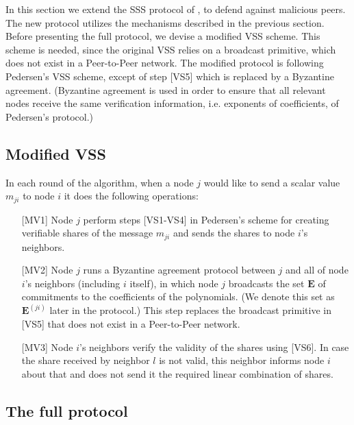 \documentclass[10pt]{svjour3}
\begin{document}
In this section we extend the SSS protocol of , to
defend against malicious peers.  The new protocol utilizes the
mechanisms described in the previous section.  Before presenting the
full protocol, we devise a modified VSS scheme.  This scheme is
needed, since the original VSS relies on a broadcast primitive, which
does not exist in a Peer-to-Peer network. The modified protocol is
following Pedersen's VSS scheme, except of step [VS5] which is
replaced by a Byzantine agreement. (Byzantine agreement is used in
order to ensure that all relevant nodes receive the same verification
information, i.e. exponents of coefficients, of Pedersen's protocol.)


\subsection{Modified VSS}
In each round of the algorithm, when a node $j$ would like to send
a scalar value $m_{ji}$ to node $i$ it does the following operations:
\begin{itemize}
\item [{[MV1]}] Node $j$ perform steps [VS1-VS4] in Pedersen's
scheme for creating verifiable shares of the message $m_{ji}$ and
sends the shares to node $i$'s neighbors.

\item [{[MV2]}] Node $j$ runs a Byzantine agreement protocol
  between $j$ and all of node $i$'s neighbors (including $i$ itself), in which node $j$
  broadcasts the set $\mathbf E$ of commitments to the coefficients of
  the polynomials. (We denote
  this set as $\mathbf E^{(ji)}$ later in the protocol.)  This step
  replaces the broadcast primitive in [VS5] that does not exist
  in a Peer-to-Peer network.

\item [{[MV3]}] Node $i$'s neighbors verify the validity of the shares
using [VS6]. In case the share received by neighbor $l$ is not valid,
this neighbor informs node $i$ about that and does not send it the
required linear combination of shares.
\end{itemize}



\subsection{The full protocol}
\end{document}
